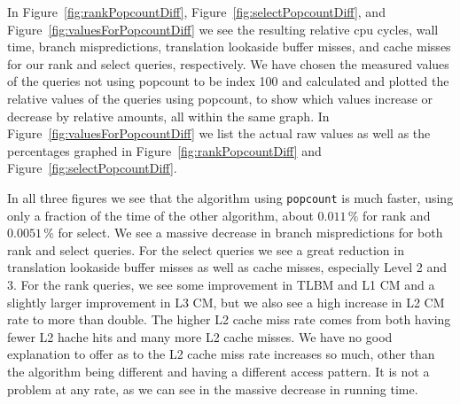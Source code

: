 In Figure~\ref{fig:rankPopcountDiff}, Figure~\ref{fig:selectPopcountDiff}, and Figure~\ref{fig:valuesForPopcountDiff} we see the resulting relative cpu cycles, wall time, branch mispredictions, translation lookaside buffer misses, and cache misses for our rank and select queries, respectively.
We have chosen the measured values of the queries not using popcount to be index 100 and calculated and plotted the relative values of the queries using popcount, to show which values increase or decrease by relative amounts, all within the same graph.
In Figure~\ref{fig:valuesForPopcountDiff} we list the actual raw values as well as the percentages graphed in Figure~\ref{fig:rankPopcountDiff} and Figure~\ref{fig:selectPopcountDiff}.

In all three figures we see that the algorithm using \texttt{popcount} is much faster, using only a fraction of the time of the other algorithm, about $0.011\,\%$ for rank and $0.0051\,\%$ for select.
We see a massive decrease in branch mispredictions for both rank and select queries.
For the select queries we see a great reduction in translation lookaside buffer misses as well as cache misses, especially Level 2 and 3.
For the rank queries, we see some improvement in TLBM and L1 CM and a slightly larger improvement in L3 CM, but we also see a high increase in L2 CM rate to more than double.
The higher L2 cache miss rate comes from both having fewer L2 hache hits and many more L2 cache misses.
We have no good explanation to offer as to the L2 cache miss rate increases so much, other than the algorithm being different and having a different access pattern.
It is not a problem at any rate, as we can see in the massive decrease in running time.

